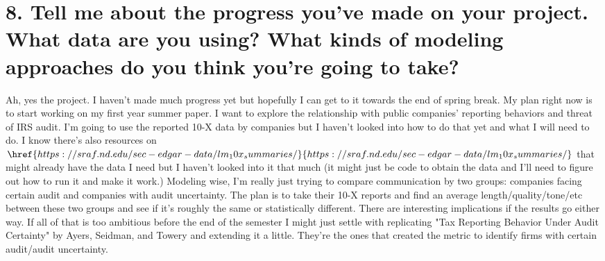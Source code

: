\documentclass{article}
\begin{document}
\section*{8. Tell me about the progress you've made on your project. What data are you using? What kinds of modeling approaches do you think you’re going to take?
}
Ah, yes the project. I haven't made much progress yet but hopefully I can get to it towards the end of spring break. My plan right now is to start working on my first year summer paper. I want to explore the relationship with public companies' reporting behaviors and threat of IRS audit. I'm going to use the reported 10-X data by companies but I haven't looked into how to do that yet and what I will need to do. I know there's also resources on $\href{https://sraf.nd.edu/sec-edgar-data/lm_10x_summaries/}{https://sraf.nd.edu/sec-edgar-data/lm_10x_summaries/}$ that might already have the data I need but I haven't looked into it that much (it might just be code to obtain the data and I'll need to figure out how to run it and make it work.)
Modeling wise, I'm really just trying to compare communication by two groups: companies facing certain audit and companies with audit uncertainty. The plan is to take their 10-X reports and find an average length/quality/tone/etc between these two groups and see if it's roughly the same or statistically different. There are interesting implications if the results go either way.
If all of that is too ambitious before the end of the semester I might just settle with replicating "Tax Reporting Behavior Under Audit Certainty" by Ayers, Seidman, and Towery and extending it a little. They're the ones that created the metric to identify firms with certain audit/audit uncertainty.
\end{document}
